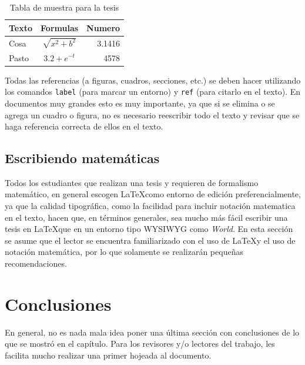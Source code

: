 \begin{table}
  \centering
  \caption{Tabla de muestra para la tesis}
  \label{Ta:primer ejemplo}
  \vspace{.1cm}
  
  \begin{tabular}{|l|c|r|}
    \hline
    Texto & Formulas & Numero \\
    \hline\hline
    Cosa & $\sqrt{x^2 + b^2}$ & 3.1416 \\
    Pasto & $3.2 + e^{-t}$ & 4578 \\
    \hline
  \end{tabular}
\end{table}

Todas las referencias (a figuras, cuadros, secciones, etc.) se deben
hacer utilizando los comandos \verb+label+ (para marcar un entorno) y
\verb+ref+ (para citarlo en el texto). En documentos muy grandes esto
es muy importante, ya que si se elimina o se agrega un cuadro o
figura, no es necesario reescribir todo el texto y revisar que se
haga referencia correcta de ellos en el texto.



\subsection{Escribiendo matemáticas}


Todos los estudiantes que realizan una tesis y requieren
de formalismo matemático, en general escogen \LaTeX como entorno de edición
preferencialmente, ya que la calidad tipográfica, como la facilidad
para incluir notación matematica en el texto, hacen que, en términos
generales, sea mucho más fácil escribir una tesis en \LaTeX que en un
entorno tipo WYSIWYG como \emph{World}. En esta sección se asume que
el lector se encuentra familiarizado con el uso de \LaTeX y el uso de
notación matemática, por lo que solamente se realizarán pequeñas recomendaciones. 





\section{Conclusiones}
En general, no es nada mala idea poner una última sección con
conclusiones de lo que se mostró en el capítulo. Para los revisores
y/o lectores del trabajo, les facilita mucho realizar una primer
hojeada al documento.

